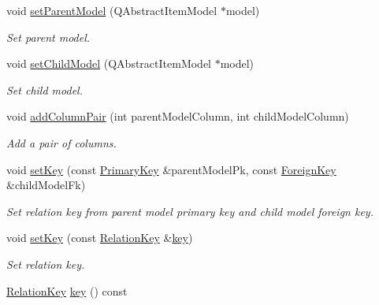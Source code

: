 \begin{DoxyCompactItemize}
\item 
void \hyperlink{class_mdt_1_1_item_model_1_1_relation_key_copier_af163f1645e504521662abda21d4d6ae6}{set\+Parent\+Model} (Q\+Abstract\+Item\+Model $\ast$model)
\begin{DoxyCompactList}\small\item\em Set parent model. \end{DoxyCompactList}\item 
void \hyperlink{class_mdt_1_1_item_model_1_1_relation_key_copier_ada8fc2fc7d05de0d776535048e3137c7}{set\+Child\+Model} (Q\+Abstract\+Item\+Model $\ast$model)
\begin{DoxyCompactList}\small\item\em Set child model. \end{DoxyCompactList}\item 
void \hyperlink{class_mdt_1_1_item_model_1_1_relation_key_copier_a4c3dd39e2643db52d293cb8046bedb1d}{add\+Column\+Pair} (int parent\+Model\+Column, int child\+Model\+Column)
\begin{DoxyCompactList}\small\item\em Add a pair of columns. \end{DoxyCompactList}\item 
void \hyperlink{class_mdt_1_1_item_model_1_1_relation_key_copier_ac12292f5a74660172df78973967b8b2d}{set\+Key} (const \hyperlink{class_mdt_1_1_item_model_1_1_primary_key}{Primary\+Key} \&parent\+Model\+Pk, const \hyperlink{class_mdt_1_1_item_model_1_1_foreign_key}{Foreign\+Key} \&child\+Model\+Fk)
\begin{DoxyCompactList}\small\item\em Set relation key from parent model primary key and child model foreign key. \end{DoxyCompactList}\item 
void \hyperlink{class_mdt_1_1_item_model_1_1_relation_key_copier_a9933201930c6d4ab74a1dbc555b1a309}{set\+Key} (const \hyperlink{class_mdt_1_1_item_model_1_1_relation_key}{Relation\+Key} \&\hyperlink{class_mdt_1_1_item_model_1_1_relation_key_copier_a136fdae81418f2a0ef99da0d4df5a775}{key})
\begin{DoxyCompactList}\small\item\em Set relation key. \end{DoxyCompactList}\item 
\hyperlink{class_mdt_1_1_item_model_1_1_relation_key}{Relation\+Key} \hyperlink{class_mdt_1_1_item_model_1_1_relation_key_copier_a136fdae81418f2a0ef99da0d4df5a775}{key} () const \hypertarget{class_mdt_1_1_item_model_1_1_relation_key_copier_a136fdae81418f2a0ef99da0d4df5a775}{}\label{class_mdt_1_1_item_model_1_1_relation_key_copier_a136fdae81418f2a0ef99da0d4df5a775}


\end{DoxyCompactItemize}
